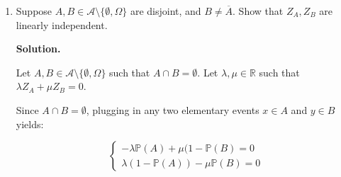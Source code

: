 \documentclass[12pt]{article}
\newcommand{\R}{\mathbb{R}}
\newcommand{\E}{\mathbb{E}}
\newenvironment{solution}{\vspace{0.2cm} \textbf{Solution.}}{}
\begin{document}
\begin{enumerate}[label=(\alph*)]
		\begin{solution}
		
		It is a fact that $Z_A \in E$ for any $A\in \mathcal{A}$ since this is a random variable with first and second moment respectively such that: $\E(Z_A) = \E(I_A - \mathbb{P}(A)) = \E(I_A) - \mathbb{P}(A) = 0$ and $\E(Z_A^2) = \E(I_A^2 -2\mathbb{P}(A) I_A + \mathbb{P}(A)^2) = \E(I_A^2) -2\mathbb{P}(A)\E(I_A) + \mathbb{P}(A)^2 = \mathbb{P}(A) (1 - \mathbb{P}(A))$, so $\E(Z_A^2)\leq \infty$ since $I_A^2 = I_A$.
		
		Besides, for $A,B\in \mathcal{A}$, $\langle Z_A , Z_B \rangle = \langle I_A - \mathbb{P}(A) , I_B - \mathbb{P}(B) \rangle = \langle I_A, I_B \rangle - \langle I_A,\mathbb{P}(B) \rangle - \langle \mathbb{P}(A),I_B \rangle + \langle \mathbb{P}(A), \mathbb{P}(B) \rangle  = \langle I_A,I_B \rangle$
		
		So, $\langle Z_A , Z_B \rangle = \E((I_A - \mathbb{P}(A))(I_B - \mathbb{P}(B))) = \E(I_{A\cap B} - \mathbb{P}(B) I_A - \mathbb{P}(A) I_B + \mathbb{P}(A)\mathbb{P}(B))$.
		
		Id est, $\langle Z_A , Z_B \rangle= \mathbb{P}(A\cap B) - \mathbb{P}(A) \mathbb{P}(B)$.
		
		We can see that $Z_A \perp Z_B$ when $ \mathbb{P}(A\cap B) = \mathbb{P}(A) \mathbb{P}(B)$, that is, when events $A$ and $B$ are stochastically independent.
		
		
		$Z_A, Z_{\overline{A}} $ are not linearly independent in $E$ since for any $Z_{\overline{A}} = 1 - Z_A$.
		\end{solution}
		\item Suppose $A, B \in \mathcal{A} \setminus \{\emptyset, \Omega\}$ are disjoint, and $B \neq \overline{A}$. Show that $Z_A, Z_B$ are linearly independent.
		
		\begin{solution}
			
		Let $A, B \in \mathcal{A} \setminus \{\emptyset, \Omega\}$ such that $A\cap B = \emptyset$.
				Let $\lambda, \mu \in \R$ such that $\lambda Z_A + \mu Z_B = 0$.
		
		Since $A\cap B = \emptyset$, plugging in any two elementary events $x\in A$ and $y \in B$ yields:
		
		\[
		\begin{cases}
			-\lambda \mathbb{P}(A) + \mu (1 - \mathbb{P}(B) = 0 \\ \lambda (1 - \mathbb{P}(A)) - \mu \mathbb{P}(B) = 0
		\end{cases} 
		\]
		

\end{solution}
\end{enumerate}
\end{document}
